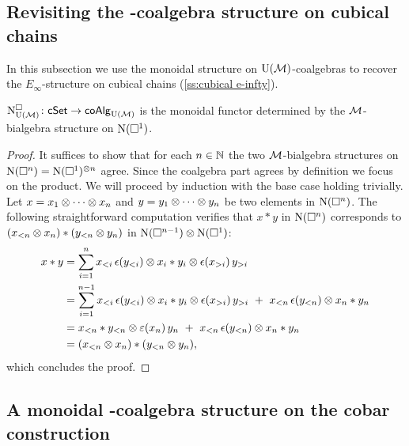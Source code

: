 \subsection{Revisiting the \pdfEinfty-coalgebra structure on cubical chains}\label{ss:cube_einfty revisited}

In this subsection we use the monoidal structure on ${\operatorname{U}(\mathcal{M})}$-coalgebras to recover the $E_\infty$-structure on cubical chains (\cref{ss:cubical e-infty}).

\begin{theorem}\label{t:cubical e-infty chains are monoidal}
	$\operatorname{N^{\square}_{{\operatorname{U}(\mathcal{M})}}} \colon \mathsf{cSet} \to \mathsf{coAlg}_{\operatorname{U}(\mathcal{M})}$ is the monoidal functor determined by the $\mathcal{M}$-bialgebra structure on $\operatorname{N}(\square^1)$.
\end{theorem}

\begin{proof}
	It suffices to show that for each $n \in \mathbb{N}$ the two $\mathcal{M}$-bialgebra structures on $\operatorname{N}(\square^n) = \operatorname{N}(\square^1)^{\otimes n}$ agree.
	Since the coalgebra part agrees by definition we focus on the product.
	We will proceed by induction with the base case holding trivially.
	Let $x = x_1 \otimes \dotsb \otimes x_n$ and $y = y_1 \otimes \dotsb \otimes y_n$ be two elements in $\operatorname{N}(\square^n)$.
	The following straightforward computation verifies that $x \ast y$ in $\operatorname{N}(\square^n)$ corresponds to $(x_{<n} \otimes x_n) \ast (y_{<n} \otimes y_n)$ in $\operatorname{N}(\square^{n-1}) \otimes \operatorname{N}(\square^1)$:
	\begin{align*}
		x \ast y &=
		\sum_{i=1}^n x_{<i}\, \epsilon(y_{<i}) \otimes x_i \ast y_i \otimes \epsilon(x_{>i}) \, y_{>i} \\ &=
		\sum_{i=1}^{n-1} x_{<i}\, \epsilon(y_{<i}) \otimes x_i \ast y_i \otimes \epsilon(x_{>i}) \, y_{>i} \ +\
		x_{<n}\, \epsilon(y_{<n}) \otimes x_n \ast y_n \\ &=
		x_{<n} \ast y_{<n} \otimes \operatorname{\varepsilon}(x_n)\, y_n \ +\ x_{<n}\, \epsilon(y_{<n}) \otimes x_n \ast y_n \\ &=
		(x_{<n} \otimes x_n) \ast (y_{<n} \otimes y_n),
	\end{align*}
	which concludes the proof.
\end{proof}

\subsection{A monoidal \pdfEinfty-coalgebra structure on the cobar construction}\label{ss:e-infty on cobar}

